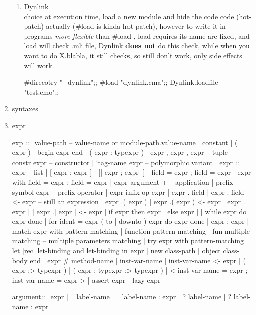 \begin{enumerate}
\begin{enumerate}
    \item Dynlink \\
      choice at execution time, load a new module and hide the
      code code (hot-patch)
      actually (\#load is kinda hot-patch), however to write it in programs
      \emph{more flexible} than \#load , load requires its name are fixed, and
      load will check .mli file, Dynlink \textbf{does not} do this check, while when you
      want to do X.blabla, it still checks, so still don't work, only side
      effects will work.

\begin{redcode}
#direcotry "+dynlink";;
#load "dynlink.cma";;
Dynlink.loadfile "test.cmo";;
\end{redcode}

    \end{enumerate}

  \item syntaxes
  \item expr

\begin{bluecode}
exp	::=value-path  -- value-name or module-path.value-name
 	| constant  
 	| ( expr )  
 	| begin expr end  
 	| ( expr :  typexpr )  
 	| expr ,  expr  { , expr } -- tuple
 	| constr  expr  -- constructor
 	| `tag-name  expr  -- polymorphic variant
 	| expr ::  expr  -- list 
 	| [ expr  { ; expr } ]  
 	| [| expr  { ; expr } |]  
 	| { field =  expr  { ; field =  expr } }  
 	| { expr with  field =  expr  { ; field =  expr } }  
 	| expr  { argument }+ -- application  
 	| prefix-symbol  expr  -- prefix operator
 	| expr  infix-op  expr  
 	| expr .  field  
 	| expr .  field <-  expr  -- still an expression
 	| expr .(  expr )  
 	| expr .(  expr ) <-  expr  
 	| expr .[  expr ]  
 	| expr .[  expr ] <-  expr  
 	| if expr then  expr  [ else expr ]  
 	| while expr do  expr done  
 	| for ident =  expr  ( to |  downto ) expr do  expr done  
 	| expr ;  expr  
 	| match expr with  pattern-matching  
 	| function pattern-matching  
 	| fun multiple-matching  -- multiple parameters matching
 	| try expr with  pattern-matching  
 	| let [rec] let-binding   { and let-binding } in  expr  
 	| new class-path  
 	| object class-body end  
 	| expr #  method-name  
 	| inst-var-name  
 	| inst-var-name <-  expr  
 	| ( expr :>  typexpr )  
 	| ( expr :  typexpr :>  typexpr )  
 	| {< inst-var-name =  expr  { ; inst-var-name =  expr } >}  
 	| assert expr  
 	| lazy expr  
 
argument::=expr  
 	| ~ label-name  
 	| ~ label-name :  expr  
 	| ? label-name  
 	| ? label-name :  expr  
 

\end{bluecode}
\end{enumerate}
